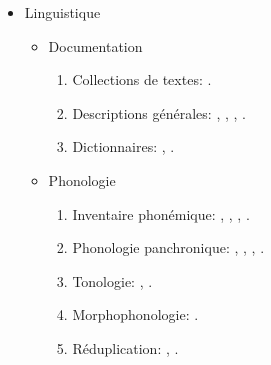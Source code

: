 \documentclass[oneside,a4paper,11pt]{article}
\newcommand{\zh}[1]{{\cn #1}}
\newcommand{\lingua}[3]{#2}%
\begin{document}
\begin{itemize}
\item  \lingua{Linguistics}{Linguistique}{语言学}
\begin{itemize}
\item  \lingua{Documentation}{Documentation}{记录语言学}
\begin{enumerate}
\item  \lingua{Text collections}{Collections de textes}{语料库}: \cite{jacques10gesar}.
\item \lingua{General descriptions}{Descriptions générales}{语法概论以及语法参考书}: \cite{jacques04these}, \cite{jacques08}, \cite{jacques17sketch}, \cite{jacques17stau}.
\item \lingua{Dictionaries}{Dictionnaires}{词典}: \cite{jacques15japhug}, \cite{jacques15khaling}.
\end{enumerate}

\item \lingua{Phonology}{Phonologie}{音系学}
\begin{enumerate}
\item  \lingua{Phonemic inventory}{Inventaire phonémique}{音位系统}: \cite{jacques04these},  \cite{jacques12khaling}, \cite{jacques14cone}, \cite{jacques18ipa}.
\item  \lingua{Panchronic Phonology}{Phonologie panchronique}{泛时音系学}:  \cite{jacques11lingua}, \cite{michaud-jacques12nasalite},     \cite{jacques13arapaho}, \cite{jacques16phono.arapaho}.
\item   \lingua{Tonology}{Tonologie}{声调}: \cite{jacques11pumi.tone}, \cite{jacques16tonogenesis}.
\item \lingua{Morphophonology}{Morphophonologie}{形态音系学}: \cite{jacques12khaling}.
\item \lingua{Reduplication}{Réduplication}{重叠式}:  \cite{jacques04redupl},  \cite{jacques07redupl}.
\end{enumerate}


\end{itemize}
\end{itemize}
\end{document}
